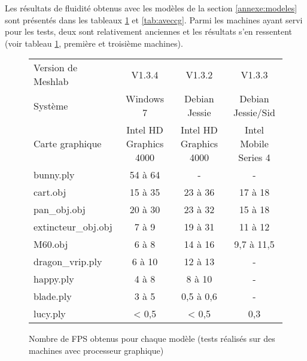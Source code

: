Les résultats de fluidité obtenus avec les modèles de la section \ref{annexe:modeles} sont présentés dans les tableaux \ref{tab:avecprocgraphique} et \ref{tab:aveccg}. Parmi les machines ayant servi pour les tests, deux sont relativement anciennes et les résultats s'en ressentent (voir tableau \ref{tab:avecprocgraphique}, première et troisième machines).

\begin{figure}
  \begin{changemargin}{-4cm}{-4cm}
    \centering
    \begin{tabular}{|l|c|c|c|}
      \hline
      Version de Meshlab & V1.3.4 & V1.3.2 & V1.3.3 \\
      Système & Windows 7 & Debian Jessie & Debian Jessie/Sid \\
      Carte graphique & Intel HD Graphics 4000 & Intel HD Graphics 4000 & Intel Mobile Series 4 \\ \hline \hline
      bunny.ply & 54 à 64 & - & - \\ \hline
      cart.obj & 15 à 35 & 23 à 36 & 17 à 18 \\ \hline
      pan\_obj.obj & 20 à 30 & 23 à 32 & 15 à 18 \\ \hline
      extincteur\_obj.obj & 7 à 9 & 19 à 31 & 11 à 12 \\ \hline
      M60.obj & 6 à 8 & 14 à 16 & 9,7 à 11,5 \\ \hline
      dragon\_vrip.ply & 6 à 10 & 12 à 13 & - \\ \hline
      happy.ply & 4 à 8 & 8 à 10 & - \\ \hline
      blade.ply & 3 à 5 & 0,5 à 0,6 & - \\ \hline
      lucy.ply & < 0,5 & < 0,5 & 0,3 \\ \hline
    \end{tabular}
  \end{changemargin}
  \caption{Nombre de FPS obtenus pour chaque modèle (tests réalisés sur des machines avec processeur graphique)}
  \label{tab:avecprocgraphique}
\end{figure}

